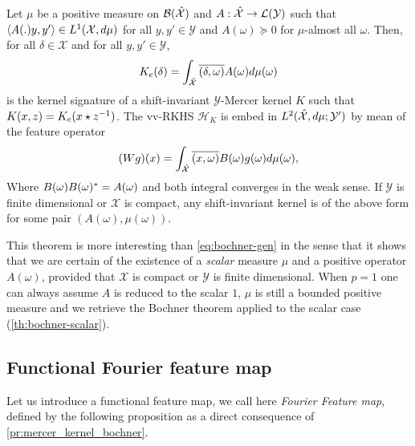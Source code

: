 \begin{proposition}\label{pr:mercer_kernel_bochner}
Let $\mu$ be a positive measure on $\mathcal{B}(\mathcal{\hat{\mathcal{X}}})$ and $A: \hat{\mathcal{X}}\to \mathcal{L}(\mathcal{Y})$ such that $\langle A(.)y,y'\rangle\in L^1(\mathcal{X},d\mu)$ for all $y,y'\in\mathcal{Y}$ and $A(\omega)\succcurlyeq 0$ for $\mu$-almost all $\omega$. Then, for all $\delta \in \mathcal{X}$ and for all $y, y' \in \mathcal{Y}$,
\begin{dmath}
\label{eq:AK0}
K_e(\delta)=\int_{\dual{\mathcal{X}}}\conj{\pairing{\delta,\omega}}A(\omega)d\mu(\omega)
\end{dmath}
is the kernel signature of a shift-invariant $\mathcal{Y}$-Mercer kernel $K$ such that $K(x,z)=K_e(x \star {z}^{-1})$. The \acs{vv-RKHS} $\mathcal{H}_K$ is embed in $L^2(\hat{\mathcal{X}},d\mu;\mathcal{Y}')$ by mean of the feature operator
\begin{dmath}
\label{eq:feature_operator}
(Wg)(x)=\int_{\mathcal{\dual{X}}}\conj{\pairing{x,\omega}}B(\omega)g(\omega)d\mu(\omega),
\end{dmath}
Where $B(\omega)B(\omega)^*=A(\omega)$ and both integral converges in the weak sense. If $\mathcal{Y}$ is finite dimensional or $\mathcal{X}$ is compact, any shift-invariant kernel is of the above form for some pair $(A(\omega),\mu (\omega))$. 
\end{proposition}
This theorem is more interesting than \cref{eq:bochner-gen} in the sense that it shows that we are certain of the existence of a \emph{scalar} measure $\mu$ and a positive operator $A(\omega)$, provided that $\mathcal{X}$ is compact or $\mathcal{Y}$ is finite dimensional. When $p=1$ one can always assume $A$ is reduced to the scalar $1$, $\mu$ is still a bounded positive measure and we retrieve the Bochner theorem applied to the scalar case (\cref{th:bochner-scalar}).

\subsection{Functional Fourier feature map}
Let us introduce a functional feature map, we call here \emph{Fourier Feature map}, defined by the following proposition as a direct consequence of \cref{pr:mercer_kernel_bochner}.


